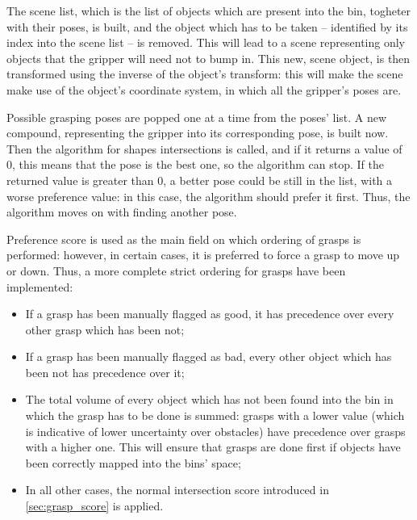 The scene list, which is the list of objects which are present into
the bin, togheter with their poses, is built, and the object which has
to be taken -- identified by its index into the scene list -- is
removed. This will lead to a scene representing only objects that
the gripper will need not to bump in. This new, scene object, is then
transformed using the inverse of the object's transform: this will
make the scene make use of the object's coordinate system, in which
all the gripper's poses are.

Possible grasping poses are popped one at a time from the poses'
list. A new compound, representing the gripper into its corresponding
pose, is built now. Then the algorithm for shapes intersections is
called, and if it returns a value of 0, this means that the pose is
the best one, so the algorithm can stop. If the returned value is
greater than 0, a better pose could be still in the list, with a worse
preference value: in this case, the algorithm should prefer it
first. Thus, the algorithm moves on with finding another pose.














Preference score is used as the main field on which ordering of
grasps is performed: however, in certain cases, it is preferred to
force a grasp to move up or down. Thus, a more complete strict
ordering for grasps have been implemented:
\begin{itemize}
\item {If a grasp has been manually flagged as good, it has
  precedence over every other grasp which has been not;}
\item{If a grasp has been manually flagged as bad, every other object
  which has been not has precedence over it;}
\item{The total volume of every object which has not been found into
  the bin in which the grasp has to be done is summed: grasps with a
  lower value (which is indicative of lower uncertainty over
  obstacles) have precedence over grasps with a higher one. This
  will ensure that grasps are done first if objects have been
  correctly mapped into the bins' space;}
\item{In all other cases, the normal intersection score introduced
  in \ref{sec:grasp_score} is applied.}
\end{itemize}

